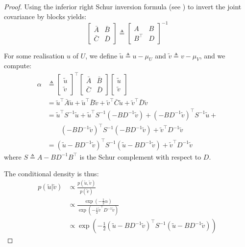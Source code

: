 \begin{proof}
	Using the inferior right Schur inversion formula (see ) to invert the joint covariance by blocks yields:
	\begin{equation}
		\begin{bmatrix}\bar{A}&\bar{B}\\\bar{C}&\bar{D}\end{bmatrix}\triangleq\begin{bmatrix}A&B\\B^\top&D\end{bmatrix}^{-1}
	\end{equation}

	For some realisation $u$ of $U$, we define $\tilde{u}\triangleq u-\mu_U$ and $\tilde{v}\triangleq v-\mu_V$, and we compute:
	\begin{equation}
		\begin{aligned}
		\alpha&\triangleq\begin{bmatrix}\tilde{u}\\\tilde{v}\end{bmatrix}^\top\begin{bmatrix}\bar{A}&\bar{B}\\\bar{C}&\bar{D}\end{bmatrix}\begin{bmatrix}\tilde{u}\\\tilde{v}\end{bmatrix}\\
		&=\tilde{u}^\top\bar{A}\tilde{u}+\tilde{u}^\top\bar{B}\tilde{v}+\tilde{v}^\top\bar{C}\tilde{u}+\tilde{v}^\top\bar{D}\tilde{v}\\
		&=\tilde{u}^\top S^{-1}\tilde{u}+\tilde{u}^\top S^{-1}\left(-BD^{-1}\tilde{v}\right)+\left(-BD^{-1}\tilde{v}\right)^\top S^{-1}\tilde{u}+\\
		&\qquad\left(-BD^{-1}\tilde{v}\right)^\top S^{-1}\left(-BD^{-1}\tilde{v}\right)+\tilde{v}^\top D^{-1}\tilde{v}\\
		&=(\tilde{u}-BD^{-1}\tilde{v})^\top S^{-1}(\tilde{u}-BD^{-1}\tilde{v})+\tilde{v}^\top D^{-1}\tilde{v}
		\end{aligned}
	\end{equation}
	where $S\triangleq A-BD^{-1}B^\top$ is the Schur complement with respect to $D$.

	The conditional density is thus:
	\begin{equation}
		\begin{aligned}
		p\left(\tilde{u}|\tilde{v}\right)&\propto\frac{\displaystyle p\left(\tilde{u},\tilde{v}\right)}{\displaystyle p\left(\tilde{v}\right)}\\
		&\propto\frac{\displaystyle\exp\left(-\frac{1}{2}\alpha\right)}{\displaystyle\exp\left(-\frac{1}{2}\tilde{v}^\top D^{-1}\tilde{v}\right)}\\
		&\propto\exp\left(-\frac{1}{2}(\tilde{u}-BD^{-1}\tilde{v})^\top S^{-1}(\tilde{u}-BD^{-1}\tilde{v})\right)
		\end{aligned}
	\end{equation}


\end{proof}
